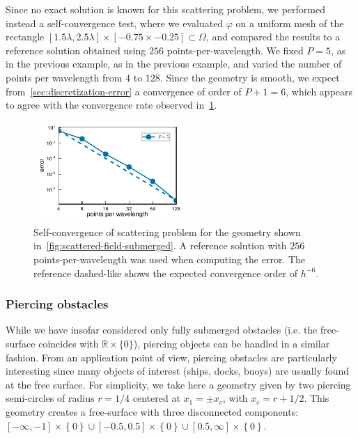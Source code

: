 \documentclass[review,hidelinks,onefignum,onetabnum]{siamart220329}
\newcommand{\R}{\mathbb{R}}
\begin{document}
Since no exact solution is known for this scattering problem, we performed instead a self-convergence test, where we evaluated $\varphi$ on a uniform mesh of the rectangle $[1.5\lambda,2.5\lambda] \times [-0.75 \times -0.25] \subset \Omega$, and compared the results to a reference solution obtained using $256$ points-per-wavelength. We fixed $P=5$, as in the previous example, as in the previous example, and varied the number of points per wavelength from $4$ to $128$. Since the geometry is smooth, we expect from~\cref{sec:discretization-error} a convergence of order of $P+1 = 6$, which appears to agree with the convergence rate observed in~\cref{fig:convergence-jellyfish}. 
\begin{figure}[ht!]
  \centering
  \includegraphics[width=0.5\textwidth]{mesh_convergence_jellyfish.pdf}
  \caption{Self-convergence of scattering problem for the geometry shown in~\cref{fig:scattered-field-submerged}. A reference solution with $256$ points-per-wavelength was used when computing the error. The reference dashed-like shows the expected convergence order of $h^{-6}$. }
  \label{fig:convergence-jellyfish}
\end{figure}

\subsubsection{Piercing obstacles}\label{sec:piercing-geo}

While we have insofar considered only fully submerged obstacles (i.e. the free-surface coincides with $\R \times \{0\}$), piercing objects can be handled in a similar fashion. From an application point of view, piercing obstacles are particularly interesting since many objects of interest (ships, docks, buoys) are usually found at the free surface. For simplicity, we take here a geometry given by two piercing semi-circles of radius $r=1/4$ centered at $x_1 = \pm x_c$, with $x_c = r + 1/2$. This geometry creates a free-surface with three disconnected components: $[-\infty, -1] \times \left\{0 \right\} \cup [-0.5,0.5] \times \left\{0 \right\} \cup [0.5, \infty] \times \left\{0 \right\}$. 
\end{document}
